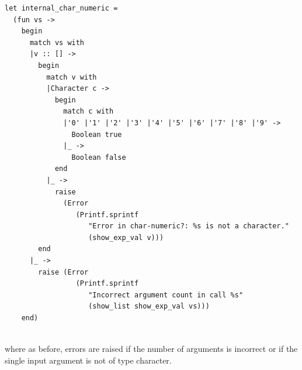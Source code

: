 \begin{scriptsize}
\begin{verbatim}
let internal_char_numeric =
  (fun vs ->
    begin
      match vs with
      |v :: [] ->
        begin
          match v with
          |Character c ->
            begin
              match c with
              |'0' |'1' |'2' |'3' |'4' |'5' |'6' |'7' |'8' |'9' ->
                Boolean true
              |_ ->
                Boolean false
            end
          |_ ->
            raise
              (Error
                 (Printf.sprintf
                    "Error in char-numeric?: %s is not a character."
                    (show_exp_val v)))
        end
      |_ ->
        raise (Error
                 (Printf.sprintf
                    "Incorrect argument count in call %s"
                    (show_list show_exp_val vs)))
    end)
\end{verbatim}
\end{scriptsize}
\\
where as before, errors are raised if the number of arguments is incorrect or if the single input argument is not of type character.
